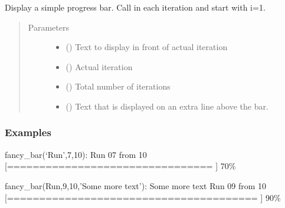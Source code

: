 \documentclass[letterpaper,10pt,english,openany,oneside]{sphinxmanual}
\begin{document}
\begin{fulllineitems}
\label{\detokenize{pygpc:pygpc.misc.display_fancy_bar}}
Display a simple progress bar. Call in each iteration and start with i=1.
\begin{quote}\begin{description}
\item[{Parameters}] \leavevmode\begin{itemize}
\item {} 
 () \textendash{} Text to display in front of actual iteration

\item {} 
 () \textendash{} Actual iteration

\item {} 
 () \textendash{} Total number of iterations

\item {} 
 (\sphinxstyleliteralemphasis{\sphinxupquote{, }}\sphinxstyleliteralemphasis{\sphinxupquote{, }}) \textendash{} Text that is displayed on an extra line above the bar.

\end{itemize}

\end{description}\end{quote}
\subsubsection*{Examples}

fancy\_bar(‘Run’,7,10):
Run 07 from 10 {[}================================        {]} 70\%

fancy\_bar(Run,9,10,’Some more text’):
Some more text
Run 09 from 10 {[}======================================= {]} 90\%

\end{fulllineitems}
\end{document}
